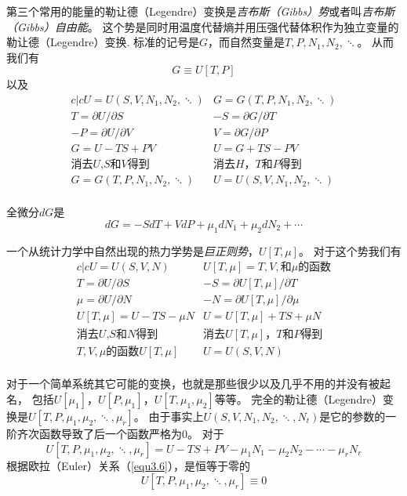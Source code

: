 第三个常用的能量的勒让德（Legendre）变换是{\it 吉布斯（Gibbs）势}或者叫{\it 吉布斯（Gibbs）自由能}。
这个势是同时用温度代替熵并用压强代替体积作为独立变量的勒让德（Legendre）变换.
标准的记号是$G$，而自然变量是$T,P,N_1,N_2,\ddots$。
从而我们有
\begin{equation}
\label{equ5.48}
  G\equiv U[T,P]
\end{equation}
以及
\begin{eqnarray}{c|c}
U=U(S,V,N_1,N_2,\ddots) & G=G(T,P,N_1,N_2,\ddots)\label{equ5.49}\\
T=\partial U/\partial S & -S=\partial G/\partial T\label{equ5.50} \\
-P=\partial U/\partial V & V=\partial G/\partial P\label{equ5.51} \\
G=U-TS+PV & U=G+TS-PV \label{equ5.52} \\
\text{消去$U$,$S$和$V$得到} & \text{消去$H$，$T$和$P$得到}\nonumber\\
G=G(T,P,N_1,N_2,\ddots) & U=U(S,V,N_1,N_2,\ddots)\nonumber\\
\end{eqnarray}

全微分$dG$是
\begin{equation}
\label{equ5.53}
  dG=-SdT+VdP+\mu_1dN_1+\mu_2dN_2+\cdots
\end{equation}

一个从统计力学中自然出现的热力学势是{\it 巨正则势}，$U[T,\mu]$。
对于这个势我们有
\begin{eqnarray}{c|c}
U=U(S,V,N) & U[T,\mu]=T,V,\text{和}\mu\text{的函数}\label{equ5.54}\\
T=\partial U/\partial S & -S=\partial U[T,\mu]/\partial T\label{equ5.55} \\
\mu=\partial U/\partial N & -N=\partial U[T,\mu]/\partial\mu\label{equ5.56} \\
U[T,\mu]=U-TS-\mu N & U=U[T,\mu]+TS+\mu N \label{equ5.57} \\
\text{消去$U$,$S$和$N$得到} & \text{消去$U[T,\mu]$，$T$和$P$得到}\nonumber\\
T,V,\mu\text{的函数}U[T,\mu] & U=U(S,V,N)\nonumber\\
\end{eqnarray}

对于一个简单系统其它可能的变换，也就是那些很少以及几乎不用的并没有被起名，
包括$U[\mu_1]$，$U[P,\mu_1]$，$U[T,\mu_1,\mu_2]$等等。
完全的勒让德（Legendre）变换是$U[T,P,\mu_1,\mu_2,\ddots,\mu_r]$。
由于事实上$U(S,V,N_1,N_2,\ddots,N_t)$是它的参数的一阶齐次函数导致了后一个函数严格为0。
对于
\begin{equation}
\label{5.59}
  U[T,P,\mu_1,\mu_2,\ddots,\mu_r]=U-TS+PV-\mu_1N_1-\mu_2N_2-\cdots-\mu_rN_r
\end{equation}
根据欧拉（Euler）关系（\eqref{equ3.6}），是恒等于零的
\begin{equation}
\label{5.60}
  U[T,P,\mu_1,\mu_2,\ddots,\mu_r]\equiv 0
\end{equation}

